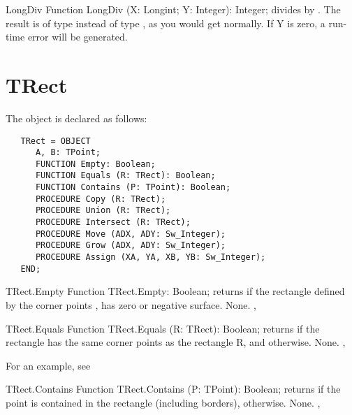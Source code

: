 \begin{function}{LongDiv}
\Declaration
Function LongDiv (X: Longint; Y: Integer): Integer;
\Description
{} divides  by . The result is of
type  instead of type , as you would get 
normally. 
\Errors
If Y is zero, a run-time error will be generated.
\SeeAlso
{}
\end{function}

\section{TRect}
\label{se:TRect}

The  object is declared as follows:
\begin{verbatim}
   TRect = OBJECT
      A, B: TPoint;
      FUNCTION Empty: Boolean;
      FUNCTION Equals (R: TRect): Boolean;
      FUNCTION Contains (P: TPoint): Boolean;
      PROCEDURE Copy (R: TRect);
      PROCEDURE Union (R: TRect);
      PROCEDURE Intersect (R: TRect);
      PROCEDURE Move (ADX, ADY: Sw_Integer);
      PROCEDURE Grow (ADX, ADY: Sw_Integer);
      PROCEDURE Assign (XA, YA, XB, YB: Sw_Integer);
   END;
\end{verbatim}

\begin{function}{TRect.Empty}
\Declaration
Function TRect.Empty: Boolean;
\Description
{} returns  if the rectangle defined by the corner points 
,  has zero or negative surface.
\Errors
None.
\SeeAlso
{}, 
\end{function}


\begin{function}{TRect.Equals}      
\Declaration
Function TRect.Equals (R: TRect): Boolean;
\Description
{} returns  if the rectangle has the 
same corner points  as the rectangle R, and 
otherwise.
\Errors
None.
\SeeAlso
{}, 
\end{function}

For an example, see 

\begin{function}{TRect.Contains}
\Declaration
Function TRect.Contains (P: TPoint): Boolean;
\Description
{} returns  if the point  is contained
in the rectangle (including borders),  otherwise.
\Errors
None.
\SeeAlso
{}, 
\end{function}

